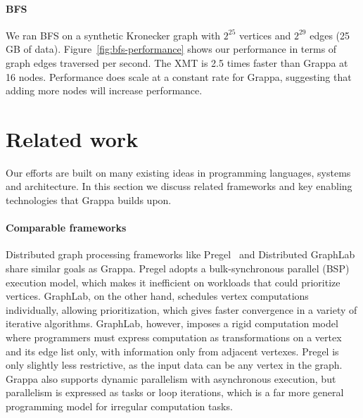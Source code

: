 \paragraph{BFS} We ran BFS on a synthetic Kronecker graph with $2^{25}$ vertices and $2^{29}$ edges (25 GB of data). Figure~\ref{fig:bfs-performance} shows our performance in terms of graph edges traversed per second. The XMT is 2.5 times faster than Grappa at 16 nodes.  Performance does scale at a constant rate for Grappa, suggesting that adding more nodes will increase performance.


\section{Related work}

Our efforts are built on many existing ideas in programming languages, systems and architecture. In this section we discuss related frameworks and key enabling technologies that Grappa builds upon.

\paragraph{Comparable frameworks} Distributed graph processing frameworks like Pregel~\cite{pregel:2010} and Distributed GraphLab~\cite{distgraphlab:vldb12} share similar goals as Grappa. Pregel adopts a bulk-synchronous parallel (BSP) execution model, which makes it inefficient on workloads that could prioritize vertices. GraphLab, on the other hand, schedules vertex computations individually, allowing prioritization, which gives faster convergence in a variety of iterative algorithms.  GraphLab, however, imposes a rigid computation model where programmers must express computation as transformations on a vertex and its edge list only, with information only from adjacent vertexes. Pregel is only slightly less restrictive, as the input data can be any vertex in the graph.  Grappa also supports dynamic parallelism with asynchronous execution, but parallelism is expressed as tasks or loop iterations, which is a far more general programming model for irregular computation tasks.

